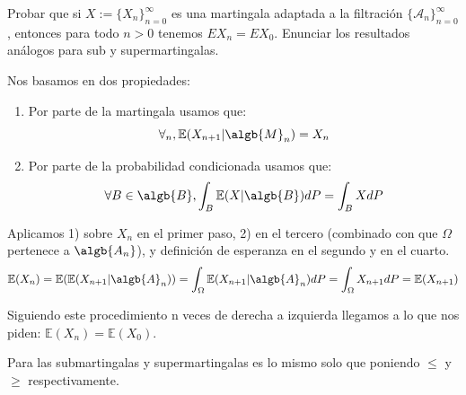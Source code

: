 \begin{problem}[4] Probar que si $X := \{X_n\}_{n=0}^{\infty}$  es una martingala adaptada a la filtraci\'on
$\{\mathcal{A}_n\}_{n=0}^{\infty}$, entonces para todo $n>0$ tenemos 
$EX_n = EX_0$. 
Enunciar los resultados an\'alogos para sub y supermartingalas.
\solution

\begin{expla}
Nos basamos en dos propiedades:
\begin{enumerate}
\item Por parte de la martingala usamos que:
$$\forall_n, \mathbb{E}(X_{n+1}|\algb{M}_n)=X_n$$
\item Por parte de la probabilidad condicionada usamos que:
$$\forall B \in \algb{B}, \int_{B}\mathbb{E}(X|\algb{B})dP=\int_{B}XdP$$
\end{enumerate}
\end{expla}
Aplicamos 1) sobre $X_n$ en el primer paso, 2) en el tercero (combinado con que $\Omega$ pertenece a $\algb{A_n}$), y definición de esperanza en el segundo y en el cuarto.
\[
\mathbb{E}(X_n) =\mathbb{E}(\mathbb{E}(X_{n+1}|\algb{A}_n)) = \int_{\Omega} \mathbb{E}(X_{n+1}|\algb{A}_n) dP = \int_{\Omega} X_{n+1}dP = \mathbb{E}(X_{n+1})
\]

Siguiendo este procedimiento n veces de derecha a izquierda llegamos a lo que nos piden: $\mathbb{E}(X_n) = \mathbb{E}(X_0)$.

Para las submartingalas y supermartingalas es lo mismo solo que poniendo $\leq$ y $\geq$ respectivamente.

\end{problem}


